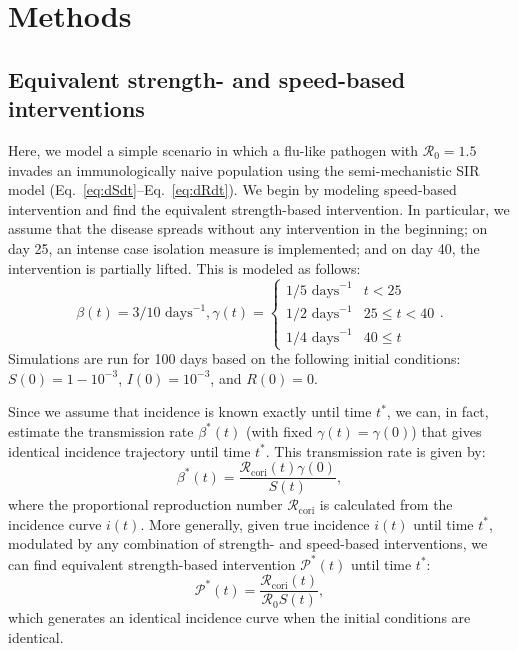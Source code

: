 \documentclass[12pt]{article}
\newcommand{\eref}[1]{Eq.~\ref{eq:#1}}
\newcommand{\Rx}[1]{\ensuremath{{\mathcal R}_{#1}}\xspace}
\newcommand{\Ro}{\Rx{0}}
\newcommand{\Rcori}{\Rx{\mathrm{cori}}}
\newcommand{\PP}{\ensuremath{\mathcal P}}
\begin{document}
\section{Methods}

\subsection{Equivalent strength- and speed-based interventions}

Here, we model a simple scenario in which a flu-like pathogen with $\Ro = 1.5$ invades an immunologically naive population using the semi-mechanistic SIR model (\eref{dSdt}--\eref{dRdt}).
We begin by modeling speed-based intervention and find the equivalent strength-based intervention.  
In particular, we assume that the disease spreads without any intervention in the beginning;
on day 25, an intense case isolation measure is implemented; and
on day 40, the intervention is partially lifted.
This is modeled as follows:
\begin{equation}
\beta(t) = 3/10\,\,\textrm{days}^{-1}, \gamma(t) = \begin{cases}
1/5\,\, \textrm{days}^{-1} & t < 25\\
1/2\,\, \textrm{days}^{-1} & 25 \leq t < 40 \\
1/4\,\, \textrm{days}^{-1} & 40 \leq t
\end{cases}.
\end{equation}
Simulations are run for 100 days based on the following initial conditions: $S(0) = 1 - 10^{-3}$, $I(0) = 10^{-3}$, and $R(0) = 0$.

Since we assume that incidence is known exactly until time $t^\ast$, we can, in fact, estimate the transmission rate $\beta^\ast(t)$ (with fixed $\gamma(t)=\gamma(0)$) that gives identical incidence trajectory until time $t^\ast$.
This transmission rate is given by:
\begin{equation}
\beta^\ast(t) = \frac{\Rcori(t)\gamma(0)}{S(t)},
\end{equation}
where the proportional reproduction number $\Rcori$ is calculated from the incidence curve $i(t)$.
More generally, given true incidence $i(t)$ until time $t^\ast$, modulated by any combination of strength- and speed-based interventions, we can find equivalent strength-based intervention $\PP^\ast(t)$ until time $t^\ast$:
\begin{equation}
\PP^\ast(t) = \frac{\Rcori(t)}{\Ro S(t)},
\end{equation}
which generates an identical incidence curve when the initial conditions are identical.


\end{document}
